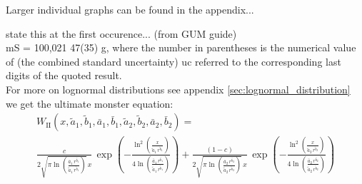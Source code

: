 Larger individual graphs can be found in the appendix...

state this at the first occurence... (from GUM guide)\\
mS = 100,021 47(35) g, where the number in parentheses is the numerical value of (the combined standard uncertainty) uc referred to the corresponding last digits of the quoted result.\\


For more on lognormal distributions see appendix \autoref{sec:lognormal_distribution}\\


we get the ultimate monster equation:\\
\begin{align}
	W_\text{II}(x,\tilde{a}_1, \tilde{b}_1, \bar{a}_1, \bar{b}_1, \tilde{a}_2, \tilde{b}_2, \bar{a}_2, \bar{b}_2) =\\
	\frac{c}{2 \sqrt{\pi \ln\left(\frac{\bar{a}_1 \, r^{\bar{b}_1}}{\tilde{a}_1 \, r^{\tilde{b}_1}}\right)} \, x} \, \exp\left(- \frac{\ln^2\left(\frac{x}{\tilde{a}_1 \, r^{\tilde{b}_1}}\right)}{4 \ln\left(\frac{\bar{a}_1 \, r^{\bar{b}_1}}{\tilde{a}_1 \, r^{\tilde{b}_1}}\right)}\right) + \frac{(1 - c)}{2 \sqrt{\pi \ln\left(\frac{\bar{a}_2 \, r^{\bar{b}_2}}{\tilde{a}_2 \, r^{\tilde{b}_2}}\right)} \, x} \, \exp\left(- \frac{\ln^2\left(\frac{x}{\tilde{a}_2 \, r^{\tilde{b}_2}}\right)}{4 \ln\left(\frac{\bar{a}_2 \, r^{\bar{b}_2}}{\tilde{a}_2 \, r^{\tilde{b}_2}}\right)}\right)
\end{align}


